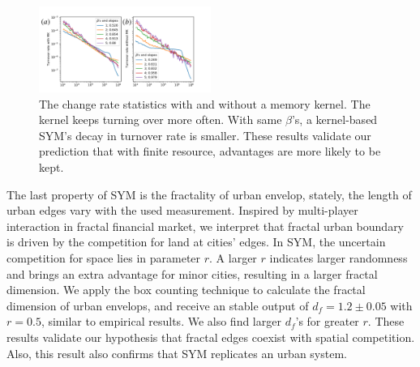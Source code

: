 \documentclass[reprint,unsortedaddress,amsmath,amssymb,aps,prl,showkeys]{revtex4-2}
\begin{document}
\begin{figure}
	\centering
	\includegraphics[width = 0.5\textwidth]{./pics/in_one_now_now.pdf}
	\caption{The change rate statistics with and without a memory kernel. The kernel keeps turning over more often. With same $\beta$'s, a kernel-based SYM's decay in turnover rate is smaller. These results validate our prediction that with finite resource, advantages are more likely to be kept.}
	\label{changerate}
\end{figure}

The last property of SYM is the fractality of urban envelop, stately, the length of urban edges vary with the used measurement. Inspired by multi-player interaction in fractal financial market\cite{PhysRevE.65.037106}, we interpret that fractal urban boundary is driven by the competition for land at cities' edges. In SYM, the uncertain competition for space lies in parameter $r$. A larger $r$ indicates larger randomness and brings an extra advantage for minor cities, resulting in a larger fractal dimension. We apply the box counting technique to calculate the fractal dimension of urban envelops, and receive an stable output of $d_f = 1.2\pm 0.05$ with $r = 0.5$, similar to empirical results\cite{batty1992form}. We also find larger $d_f$'s for greater $r$. These results validate our hypothesis that fractal edges coexist with spatial competition. Also, this result also confirms that SYM replicates an urban system.


\end{document}
